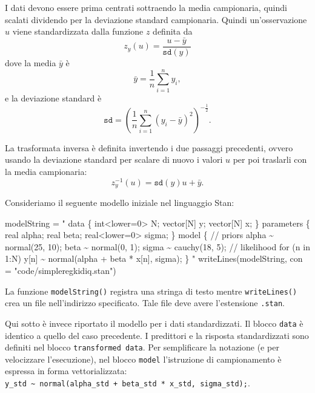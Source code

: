\documentclass[
  10pt,
  italian,
  a4paper,
  extrafontsizes,onecolumn,openright
  ]{memoir}
\newenvironment{Shaded}{\begin{snugshade}}{\end{snugshade}}
\newcommand{\AttributeTok}[1]{\textcolor[rgb]{0.77,0.63,0.00}{#1}}
\newcommand{\FunctionTok}[1]{\textcolor[rgb]{0.00,0.00,0.00}{#1}}
\newcommand{\NormalTok}[1]{#1}
\newcommand{\OtherTok}[1]{\textcolor[rgb]{0.56,0.35,0.01}{#1}}
\newcommand{\StringTok}[1]{\textcolor[rgb]{0.31,0.60,0.02}{#1}}
\begin{document}
I dati devono essere prima centrati sottraendo la media campionaria, quindi scalati dividendo per la deviazione standard campionaria. Quindi un'osservazione \(u\) viene standardizzata dalla funzione \(z\) definita da
\[
z_y(u) = \frac{u - \bar{y}}{\texttt{sd}(y)}
\]
\noindent
dove la media \(\bar{y}\) è
\[
\bar{y} = \frac{1}{n} \sum_{i=1}^n y_i,
\]
\noindent
e la deviazione standard è
\[
\texttt{sd} = \left(\frac{1}{n}\sum_{i=1}^n(y_i - \bar{y})^2\right)^{-\frac{1}{2}}.
\]

La trasformata inversa è definita invertendo i due passaggi precedenti, ovvero usando la deviazione standard per scalare di nuovo i valori \(u\) per poi traslarli con la media campionaria:
\[
z_y^{-1}(u) = \texttt{sd}(y)u + \bar{y}.
\]

Consideriamo il seguente modello iniziale nel linguaggio Stan:

\begin{Shaded}
\begin{Highlighting}[]
\NormalTok{modelString }\OtherTok{=} \StringTok{"}
\StringTok{data \{}
\StringTok{  int\textless{}lower=0\textgreater{} N;}
\StringTok{  vector[N] y;}
\StringTok{  vector[N] x;}
\StringTok{\}}
\StringTok{parameters \{}
\StringTok{  real alpha;}
\StringTok{  real beta;}
\StringTok{  real\textless{}lower=0\textgreater{} sigma;}
\StringTok{\}}
\StringTok{model \{}
\StringTok{  // priors}
\StringTok{  alpha \textasciitilde{} normal(25, 10);}
\StringTok{  beta \textasciitilde{} normal(0, 1);}
\StringTok{  sigma \textasciitilde{} cauchy(18, 5);}
\StringTok{  // likelihood}
\StringTok{  for (n in 1:N)}
\StringTok{    y[n] \textasciitilde{} normal(alpha + beta * x[n], sigma);}
\StringTok{\}}
\StringTok{"}
\FunctionTok{writeLines}\NormalTok{(modelString, }\AttributeTok{con =} \StringTok{"code/simpleregkidiq.stan"}\NormalTok{)}
\end{Highlighting}
\end{Shaded}

\noindent
La funzione \texttt{modelString()} registra una stringa di testo mentre \texttt{writeLines()} crea un file nell'indirizzo specificato. Tale file deve avere l'estensione \texttt{.stan}.

Qui sotto è invece riportato il modello per i dati standardizzati. Il blocco \texttt{data} è identico a quello del caso precedente. I predittori e la risposta standardizzati sono definiti nel blocco \texttt{transformed\ data}. Per semplificare la notazione (e per velocizzare l'esecuzione), nel blocco \texttt{model} l'istruzione di campionamento è espressa in forma vettorializzata: \texttt{y\_std\ \textasciitilde{}\ normal(alpha\_std\ +\ beta\_std\ *\ x\_std,\ sigma\_std);}.
\end{document}
